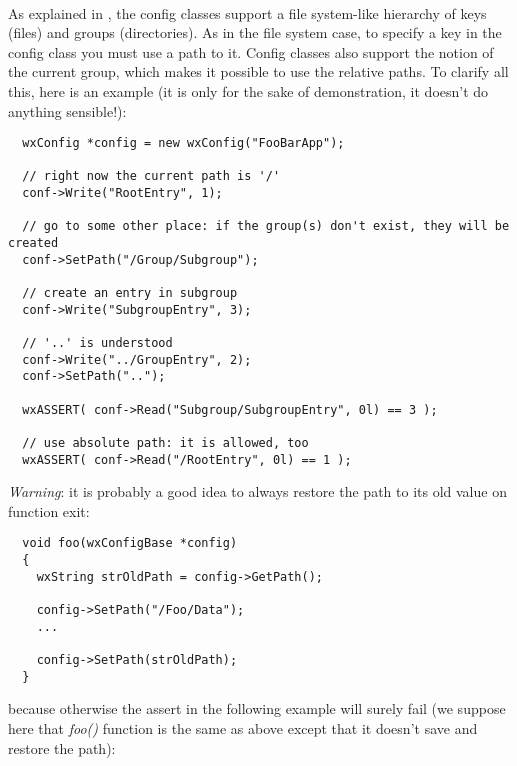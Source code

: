 \label{congigconstructordestructor}

\\


\label{configpathmanagement}

As explained in , the config classes
support a file system-like hierarchy of keys (files) and groups (directories).
As in the file system case, to specify a key in the config class you must use
a path to it. Config classes also support the notion of the current group,
which makes it possible to use the relative paths. To clarify all this, here
is an example (it is only for the sake of demonstration, it doesn't do anything
sensible!):

\begin{verbatim}
  wxConfig *config = new wxConfig("FooBarApp");

  // right now the current path is '/'
  conf->Write("RootEntry", 1);

  // go to some other place: if the group(s) don't exist, they will be created
  conf->SetPath("/Group/Subgroup");

  // create an entry in subgroup
  conf->Write("SubgroupEntry", 3);

  // '..' is understood
  conf->Write("../GroupEntry", 2);
  conf->SetPath("..");

  wxASSERT( conf->Read("Subgroup/SubgroupEntry", 0l) == 3 );

  // use absolute path: it is allowed, too
  wxASSERT( conf->Read("/RootEntry", 0l) == 1 );
\end{verbatim}

{\it Warning}: it is probably a good idea to always restore the path to its
old value on function exit:

\begin{verbatim}
  void foo(wxConfigBase *config)
  {
    wxString strOldPath = config->GetPath();

    config->SetPath("/Foo/Data");
    ...

    config->SetPath(strOldPath);
  }
\end{verbatim}

because otherwise the assert in the following example will surely fail
(we suppose here that {\it foo()} function is the same as above except that it
doesn't save and restore the path):


